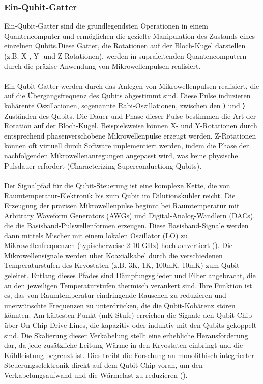 \subsubsection{Ein-Qubit-Gatter}
Ein-Qubit-Gatter sind die grundlegendsten Operationen in einem Quantencomputer und ermöglichen die gezielte Manipulation des Zustands eines einzelnen Qubits.Diese Gatter, die Rotationen auf der Bloch-Kugel darstellen (z.B. X-, Y- und Z-Rotationen), werden in supraleitenden Quantencomputern durch die präzise Anwendung von Mikrowellenpulsen realisiert.
\\\\
Ein-Qubit-Gatter werden durch das Anlegen von Mikrowellenpulsen realisiert, die auf die Übergangsfrequenz des Qubits abgestimmt sind. Diese Pulse induzieren kohärente Oszillationen, sogenannte Rabi-Oszillationen, zwischen den \big {}⟩ und \big {}⟩ Zuständen des Qubits. Die Dauer und Phase dieser Pulse bestimmen die Art der Rotation auf der Bloch-Kugel. Beispielsweise können X- und Y-Rotationen durch entsprechend phasenverschobene Mikrowellenpulse erzeugt werden. Z-Rotationen können oft virtuell durch Software implementiert werden, indem die Phase der nachfolgenden Mikrowellenanregungen angepasst wird, was keine physische Pulsdauer erfordert (Characterizing Superconductiong Qubits).\\\\Der Signalpfad für die Qubit-Steuerung ist eine komplexe Kette, die von Raumtemperatur-Elektronik bis zum Qubit im Dilutionskühler reicht. Die Erzeugung der präzisen Mikrowellenpulse beginnt bei Raumtemperatur mit Arbitrary Waveform Generators (AWGs) und Digital-Analog-Wandlern (DACs), die die Basisband-Pulswellenformen erzeugen. Diese Basisband-Signale werden dann mittels Mischer mit einem lokalen Oszillator (LO) zu Mikrowellenfrequenzen (typischerweise 2-10 GHz) hochkonvertiert (\cite{bao_cryogenic_2024}). Die Mikrowellensignale werden über Koaxialkabel durch die verschiedenen Temperaturstufen des Kryostaten (z.B. 3K, 1K, 100mK, 10mK) zum Qubit geleitet. Entlang dieses Pfades sind Dämpfungsglieder und Filter angebracht, die an den jeweiligen Temperaturstufen thermisch verankert sind. Ihre Funktion ist es, das von Raumtemperatur eindringende Rauschen zu reduzieren und unerwünschte Frequenzen zu unterdrücken, die die Qubit-Kohärenz stören könnten. Am kältesten Punkt (mK-Stufe) erreichen die Signale den Qubit-Chip über On-Chip-Drive-Lines, die kapazitiv oder induktiv mit den Qubits gekoppelt sind. Die Skalierung dieser Verkabelung stellt eine erhebliche Herausforderung dar, da jede zusätzliche Leitung Wärme in den Kryostaten einbringt und die Kühlleistung begrenzt ist. Dies treibt die Forschung an monolithisch integrierter Steuerungselektronik direkt auf dem Qubit-Chip voran, um den Verkabelungsaufwand und die Wärmelast zu reduzieren (\cite{bao_cryogenic_2024}).


